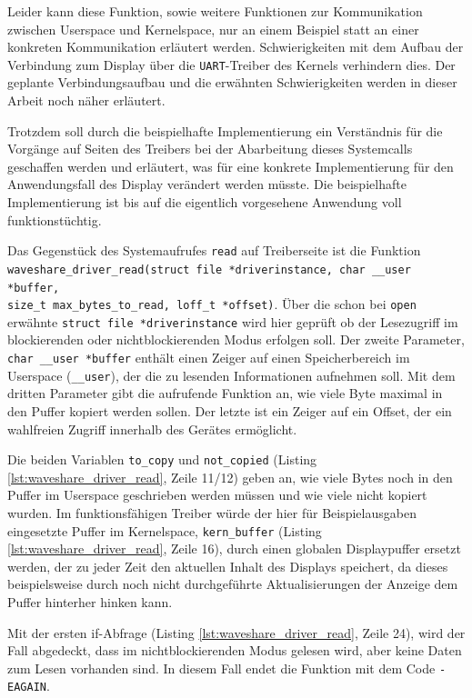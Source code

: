 Leider kann diese Funktion, sowie weitere Funktionen zur Kommunikation zwischen Userspace und Kernelspace, nur an einem Beispiel statt an einer konkreten Kommunikation erläutert werden. Schwierigkeiten mit dem Aufbau der Verbindung zum Display über die \texttt{UART}-Treiber des Kernels verhindern dies. Der geplante Verbindungsaufbau und die erwähnten Schwierigkeiten werden in dieser Arbeit noch näher erläutert. 

Trotzdem soll durch die beispielhafte Implementierung ein Verständnis für die Vorgänge auf Seiten des Treibers bei der Abarbeitung dieses Systemcalls geschaffen werden und erläutert, was für eine konkrete Implementierung für den Anwendungsfall des Display verändert werden müsste. Die beispielhafte Implementierung ist bis auf die eigentlich vorgesehene Anwendung voll funktionstüchtig.\newline


Das Gegenstück des Systemaufrufes \texttt{read} auf Treiberseite ist die Funktion \\
\texttt{waveshare_driver_read(struct file *driverinstance, char __user *buffer,} \\
\texttt{size_t max_bytes_to_read, loff_t *offset)}. Über die schon bei \texttt{open} erwähnte \texttt{struct file *driverinstance} wird hier geprüft ob der Lesezugriff im blockierenden oder nichtblockierenden Modus erfolgen soll. Der zweite Parameter, \texttt{char __user *buffer} enthält einen Zeiger auf einen Speicherbereich im Userspace (\texttt{{\_}{\_user}}), der die zu lesenden Informationen aufnehmen soll. Mit dem dritten Parameter gibt die aufrufende Funktion an, wie viele Byte maximal in den Puffer kopiert werden sollen. Der letzte ist ein Zeiger auf ein Offset, der ein wahlfreien Zugriff innerhalb des Gerätes ermöglicht. 

Die beiden Variablen \texttt{to\_copy} und \texttt{not\_copied} (Listing \ref{lst:waveshare_driver_read}, Zeile 11/12) geben an, wie viele Bytes noch in den Puffer im Userspace geschrieben werden müssen und wie viele nicht kopiert wurden. Im funktionsfähigen Treiber würde der hier für Beispielausgaben eingesetzte Puffer im Kernelspace, \texttt{kern\_buffer} (Listing \ref{lst:waveshare_driver_read}, Zeile 16), durch einen globalen Displaypuffer ersetzt werden, der zu jeder Zeit den aktuellen Inhalt des Displays speichert, da dieses beispielsweise durch noch nicht durchgeführte Aktualisierungen der Anzeige dem Puffer hinterher hinken kann. 

Mit der ersten if-Abfrage (Listing \ref{lst:waveshare_driver_read}, Zeile 24), wird der Fall abgedeckt, dass im nichtblockierenden Modus gelesen wird, aber keine Daten zum Lesen vorhanden sind. In diesem Fall endet die Funktion mit dem Code \texttt{-EAGAIN}. 

